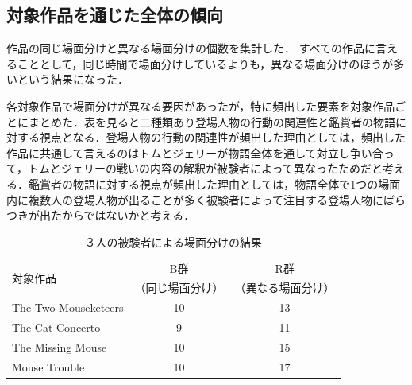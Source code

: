 \subsection{対象作品を通じた全体の傾向}
作品の同じ場面分けと異なる場面分けの個数を集計した．
すべての作品に言えることとして，同じ時間で場面分けしているよりも，異なる場面分けのほうが多いという結果になった．


各対象作品で場面分けが異なる要因があったが，特に頻出した要素を対象作品ごとにまとめた．表を見ると二種類あり登場人物の行動の関連性と鑑賞者の物語に対する視点となる．登場人物の行動の関連性が頻出した理由としては，頻出した作品に共通して言えるのはトムとジェリーが物語全体を通して対立し争い合って，トムとジェリーの戦いの内容の解釈が被験者によって異なったためだと考える．鑑賞者の物語に対する視点が頻出した理由としては，物語全体で1つの場面内に複数人の登場人物が出ることが多く被験者によって注目する登場人物にばらつきが出たからではないかと考える．

\begin{table}[t]
	\centering
	\caption{３人の被験者による場面分けの結果}
	\label{tab:kekka}
	\begin{tabular}{l|cc}
		\hline
		\multirow{2}{*}{対象作品} & B群                    & R群                     \\
		                      & \scriptsize{（同じ場面分け）} & \scriptsize{（異なる場面分け）} \\
		\hline
		The Two Mouseketeers  & 10                    & 13                     \\
		The Cat Concerto      & 9                     & 11                     \\
		The Missing Mouse     & 10                    & 15                     \\
		Mouse Trouble         & 10                    & 17                     \\
		\hline
	\end{tabular}\\
\end{table}



